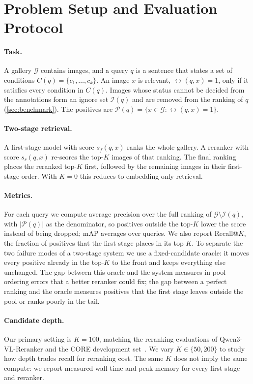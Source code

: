 \section{Problem Setup and Evaluation Protocol}
\label{sec:setup}

\paragraph{Task.}
A gallery $\mathcal{G}$ contains images, and a query $q$ is a sentence that states a set of conditions $C(q)=\{c_1,\dots,c_k\}$.
An image $x$ is relevant, $\rel(q,x)=1$, only if it satisfies every condition in $C(q)$.
Images whose status cannot be decided from the annotations form an ignore set $\mathcal{I}(q)$ and are removed from the ranking of $q$ (\cref{sec:benchmark}).
The positives are $\mathcal{P}(q)=\{x\in\mathcal{G}:\rel(q,x)=1\}$.

\paragraph{Two-stage retrieval.}
A first-stage model with score $s_f(q,x)$ ranks the whole gallery.
A reranker with score $s_r(q,x)$ re-scores the top-$K$ images of that ranking.
The final ranking places the reranked top-$K$ first, followed by the remaining images in their first-stage order.
With $K{=}0$ this reduces to embedding-only retrieval.

\paragraph{Metrics.}
For each query we compute average precision over the full ranking of $\mathcal{G}\setminus\mathcal{I}(q)$, with $|\mathcal{P}(q)|$ as the denominator, so positives outside the top-$K$ lower the score instead of being dropped; mAP averages over queries.
We also report Recall@$K$, the fraction of positives that the first stage places in its top $K$.
To separate the two failure modes of a two-stage system we use a fixed-candidate oracle: it moves every positive already in the top-$K$ to the front and keeps everything else unchanged.
The gap between this oracle and the system measures in-pool ordering errors that a better reranker could fix; the gap between a perfect ranking and the oracle measures positives that the first stage leaves outside the pool or ranks poorly in the tail.

\paragraph{Candidate depth.}
Our primary setting is $K{=}100$, matching the reranking evaluations of Qwen3-VL-Reranker and the CORE development set~\cite{qwen3vlemb2026,core2026}.
We vary $K\in\{50,200\}$ to study how depth trades recall for reranking cost.
The same $K$ does not imply the same compute: we report measured wall time and peak memory for every first stage and reranker.

